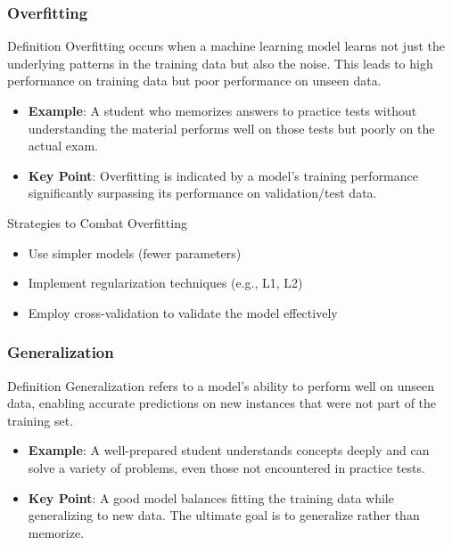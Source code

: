 \documentclass[aspectratio=169]{beamer}
\begin{document}
\begin{frame}[fragile]
    \frametitle{Overfitting}
    \begin{block}{Definition}
        Overfitting occurs when a machine learning model learns not just the underlying patterns in the training data but also the noise. This leads to high performance on training data but poor performance on unseen data.
    \end{block}
    
    \begin{itemize}
        \item \textbf{Example}: A student who memorizes answers to practice tests without understanding the material performs well on those tests but poorly on the actual exam.
        \item \textbf{Key Point}: Overfitting is indicated by a model's training performance significantly surpassing its performance on validation/test data.
    \end{itemize}
    
    \begin{block}{Strategies to Combat Overfitting}
        \begin{itemize}
            \item Use simpler models (fewer parameters)
            \item Implement regularization techniques (e.g., L1, L2)
            \item Employ cross-validation to validate the model effectively
        \end{itemize}
    \end{block}
\end{frame}

\begin{frame}[fragile]
    \frametitle{Generalization}
    \begin{block}{Definition}
        Generalization refers to a model's ability to perform well on unseen data, enabling accurate predictions on new instances that were not part of the training set.
    \end{block}
    
    \begin{itemize}
        \item \textbf{Example}: A well-prepared student understands concepts deeply and can solve a variety of problems, even those not encountered in practice tests.
        \item \textbf{Key Point}: A good model balances fitting the training data while generalizing to new data. The ultimate goal is to generalize rather than memorize.
    \end{itemize}
\end{frame}
\end{document}
